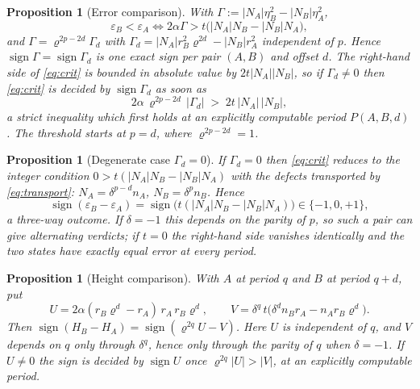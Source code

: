 \documentclass[11pt]{article}
\newtheorem{proposition}[theorem]{Proposition}
\theoremstyle{definition}
\theoremstyle{remark}
\newcommand{\pr}{\varrho}
\newcommand{\gam}{\Gamma}
\DeclareMathOperator{\sgn}{sign}
\begin{document}
\begin{proposition}[Error comparison]\label{prop:err}
With $\gam:=|N_A|\eta_B^2-|N_B|\eta_A^2$,
\begin{equation}\label{eq:crit}
\varepsilon_B<\varepsilon_A
\iff
2\alpha\gam>t\bigl(|N_A|N_B-|N_B|N_A\bigr),
\end{equation}
and $\gam=\pr^{2p-2d}\gam_d$ with
$\gam_d=|N_A|r_B^2\pr^{2d}-|N_B|r_A^2$ independent of $p$. Hence
$\sgn\gam=\sgn\gam_d$ is one exact sign per pair $(A,B)$ and offset $d$. The right-hand side of
\eqref{eq:crit} is bounded in absolute value by $2t|N_A||N_B|$, so if $\gam_d\neq0$ then
\eqref{eq:crit} is decided by $\sgn\gam_d$ as soon as
\begin{equation}\label{eq:thr}
2\alpha\,\pr^{2p-2d}\,|\gam_d|\;>\;2t\,|N_A|\,|N_B| ,
\end{equation}
a strict inequality which first holds at an explicitly computable period $P(A,B,d)$. The
threshold starts at $p=d$, where $\pr^{2p-2d}=1$.
\end{proposition}

\begin{proposition}[Degenerate case $\gam_d=0$]\label{prop:gamma0}
If $\gam_d=0$ then \eqref{eq:crit} reduces to the integer condition
$0>t(|N_A|N_B-|N_B|N_A)$ with the defects transported by \eqref{eq:transport}:
$N_A=\delta^{p-d}n_A$, $N_B=\delta^{p}n_B$. Hence
\begin{equation}\label{eq:tiesign}
\sgn(\varepsilon_B-\varepsilon_A)=\sgn\bigl(t(|N_A|N_B-|N_B|N_A)\bigr)\in\{-1,0,+1\},
\end{equation}
a three-way outcome. If $\delta=-1$ this depends on the parity of $p$, so such a pair can give
\emph{alternating} verdicts; if $t=0$ the right-hand side vanishes identically and the two
states have \emph{exactly equal} error at every period.
\end{proposition}

\begin{proposition}[Height comparison]\label{prop:height}
With $A$ at period $q$ and $B$ at period $q+d$, put
\[
U=2\alpha(r_B\pr^{d}-r_A)\,r_A\,r_B\pr^{d},\qquad
V=\delta^{q}\,t\bigl(\delta^{d}n_B r_A-n_A r_B\pr^{d}\bigr).
\]
Then $\sgn(H_B-H_A)=\sgn(\pr^{2q}U-V)$. Here $U$ is independent of $q$, and $V$ depends on $q$
only through $\delta^q$, hence only through the parity of $q$ when $\delta=-1$. If $U\neq0$ the
sign is decided by $\sgn U$ once $\pr^{2q}|U|>|V|$, at an explicitly computable period.
\end{proposition}
\end{document}
